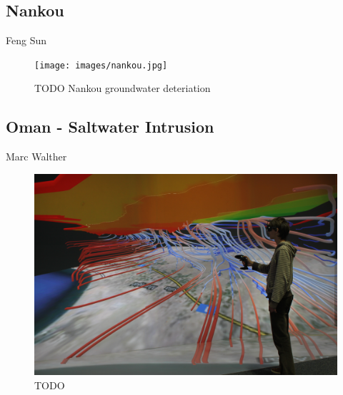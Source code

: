 \documentclass[twocolumn]{svjour3}          %
\begin{document}
\subsection{Nankou}
\label{nankou}

Feng Sun \cite{sun:ees}

\begin{figure}
  \texttt{[image: images/nankou.jpg]}
\caption{TODO Nankou groundwater deteriation}
\label{fig:nankou}
\end{figure}

\subsection{Oman - Saltwater Intrusion}
\label{oman---saltwater-intrusion}

Marc Walther

\begin{figure}
  \includegraphics[width=\linewidth]{images/oman.jpg}
\caption{TODO}
\label{fig:oman}
\end{figure}
\end{document}
